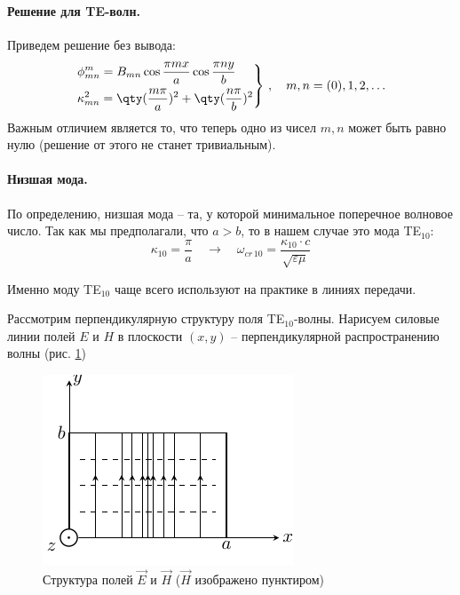 \paragraph{Решение для TE-волн.} Приведем решение без вывода:
\begin{gather}
	\label{phi_te}
	\left.\begin{aligned}
		&\phi^m_{mn}=B_{mn}\cos\frac{\pi m x}{a}\cos\frac{\pi n y}{b}\\
		&\kappa_{mn}^2=\qty(\frac{m\pi}{a})^2+\qty(\frac{n\pi}{b})^2	
	\end{aligned}\right\}\,, \quad m,n=(0),1,2,\ldots
\end{gather}
Важным отличием является то, что теперь одно из чисел $m,n$ может быть равно нулю (решение от этого не станет тривиальным).

\paragraph{Низшая мода.} По определению, низшая мода -- та, у которой минимальное поперечное волновое число. Так как мы предполагали, что $a>b$, то в нашем случае это мода TE$_{10}$:
\begin{equation}
	\kappa_{10}=\frac{\pi}{a} \quad \rightarrow \quad \omega_{cr\,10}=\frac{\kappa_{10}\cdot c}{\sqrt{\varepsilon \mu}} 	
\end{equation} 

Именно моду TE$_{10}$ чаще всего используют на практике в линиях передачи. 

Рассмотрим перпендикулярную структуру поля TE$_{10}$-волны. Нарисуем силовые линии полей $E$ и $H$ в плоскости $(x,y)$ -- перпендикулярной распространению волны (рис. \ref{fig:lect4:8})
\begin{figure}[h!]
	\centering
	\includegraphics[scale=1.5]{img/lect4_ris8}
	\caption{Структура полей $\vec{E}$ и $\vec{H}$ ($\vec{H}$ изображено пунктиром)}
	\label{fig:lect4:8}
\end{figure}

